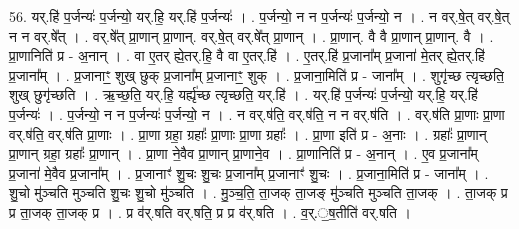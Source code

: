 \documentclass[17pt]{extarticle}
\begin{document}
56. यर्.हि॑ प॒र्जन्यः॑ प॒र्जन्यो॒ यर्.हि॒ यर्.हि॑ प॒र्जन्यः॑ । . प॒र्जन्यो॒ न न प॒र्जन्यः॑ प॒र्जन्यो॒ न । . न वर्.षे॒त् वर्.षे॒त् न न वर्.षे᳚त् । . वर्.षे᳚त् प्रा॒णान् प्रा॒णान्. वर्.षे॒त् वर्.षे᳚त् प्रा॒णान् । . प्रा॒णान्. वै वै प्रा॒णान् प्रा॒णान्. वै । . प्रा॒णानिति॑ प्र - अ॒नान् । . वा ए॒तर् ह्ये॒तर्.हि॒ वै वा ए॒तर्.हि॑ । . ए॒तर्.हि॑ प्र॒जाना᳚म् प्र॒जाना॑ मे॒तर् ह्ये॒तर्.हि॑ प्र॒जाना᳚म् । . प्र॒जानाꣳ॒॒ शुख् छुक् प्र॒जाना᳚म् प्र॒जानाꣳ॒॒ शुक् । . प्र॒जाना॒मिति॑ प्र - जाना᳚म् । . शुगृ॑च्छ त्यृच्छति॒ शुख् छुगृ॑च्छति । . ऋ॒च्छ॒ति॒ यर्.हि॒ यर्ह्यृ॑च्छ त्यृच्छति॒ यर्.हि॑ । . यर्.हि॑ प॒र्जन्यः॑ प॒र्जन्यो॒ यर्.हि॒ यर्.हि॑ प॒र्जन्यः॑ । . प॒र्जन्यो॒ न न प॒र्जन्यः॑ प॒र्जन्यो॒ न । . न वर्.ष॑ति॒ वर्.ष॑ति॒ न न वर्.ष॑ति । . वर्.ष॑ति प्रा॒णाः प्रा॒णा वर्.ष॑ति॒ वर्.ष॑ति प्रा॒णाः । . प्रा॒णा ग्रहा॒ ग्रहाः᳚ प्रा॒णाः प्रा॒णा ग्रहाः᳚ । . प्रा॒णा इति॑ प्र - अ॒नाः । . ग्रहाः᳚ प्रा॒णान् प्रा॒णान् ग्रहा॒ ग्रहाः᳚ प्रा॒णान् । . प्रा॒णा ने॒वैव प्रा॒णान् प्रा॒णाने॒व । . प्रा॒णानिति॑ प्र - अ॒नान् । . ए॒व प्र॒जाना᳚म् प्र॒जाना॑ मे॒वैव प्र॒जाना᳚म् । . प्र॒जानाꣳ॑ शु॒चः शु॒चः प्र॒जाना᳚म् प्र॒जानाꣳ॑ शु॒चः । . प्र॒जाना॒मिति॑ प्र - जाना᳚म् । . शु॒चो मु॑ञ्चति मुञ्चति शु॒चः शु॒चो मु॑ञ्चति । . मु॒ञ्च॒ति॒ ता॒जक् ता॒जङ् मु॑ञ्चति मुञ्चति ता॒जक् । . ता॒जक् प्र प्र ता॒जक् ता॒जक् प्र । . प्र व॑र्.षति वर्.षति॒ प्र प्र व॑र्.षति । . व॒र्.॒ष॒तीति॑ वर्.षति । \newline
\end{document}
